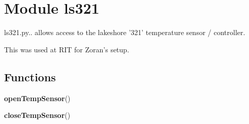 %
%
%


\section{Module ls321}

    \label{ls321}
ls321.py..  allows access to the lakeshore '321' temperature sensor / 
controller.

This was used at RIT for Zoran's setup.



  \subsection{Functions}

    \label{ls321:openTempSensor}

    \vspace{0.5ex}

    \begin{boxedminipage}{\textwidth}

    \raggedright \textbf{openTempSensor}()

    \end{boxedminipage}

    \label{ls321:closeTempSensor}

    \vspace{0.5ex}

    \begin{boxedminipage}{\textwidth}

    \raggedright \textbf{closeTempSensor}()

    \end{boxedminipage}

    \label{ls321:setTemp}


